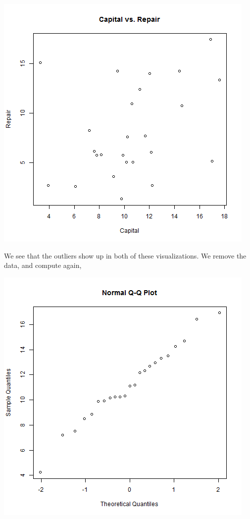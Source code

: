\documentclass[letterpaper,10pt]{article}
\begin{document}
\begin{description}
\begin{enumerate}
\begin{center}
\includegraphics[scale=.33]{CapitalvRepair.png}
\end{center}
We see that the outliers show up in both of these visualizations. We remove the data, and compute again,
\begin{center}
\includegraphics[scale=.33]{QQFuelOut.png}

\end{center}
\end{enumerate}
\end{description}
\end{document}
